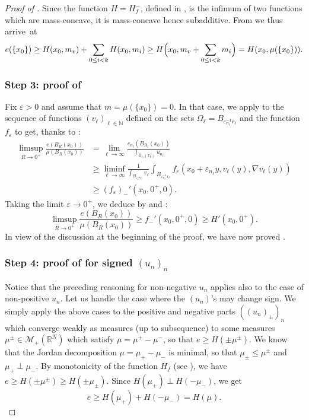 \documentclass[JEP,XML,SOM,Unicode,published]{cedram}
\theoremstyle{plain}
\theoremstyle{definition}
\newcommand{\N}{\mathbb{N}}
\newcommand{\R}{\mathbb{R}}
\newcommand{\Mspace}{\mathscr{M}}
\newcommand{\eps}{\varepsilon}
\begin{document}
\begin{proof}[Proof of ]
Since the function \(H=H_f^-\), defined in , is the infimum of two functions which are mass-concave, it is mass-concave hence subadditive. From  we thus arrive~at
\[
e(\{x_0\})\geq H(x_0,m_v) + \sum_{0\leq i<k}H(x_0,m_i) \geq H\Bigl(x_0,m_v+\sum_{0\leq i<k}m_i\Bigr)=H(x_0,\mu(\{x_0\})).
\]

\subsubsection*{Step 3: proof of } Fix $\eps >0$ and assume that \(m=\mu(\{x_0\})=0\). In that case, we apply  to the sequence of functions $(v_\ell)_{\ell\in\N}$ defined on the sets $\Omega_\ell = B_{\eps_{n_\ell}^{-1}r_\ell}$ and the function $f_\eps$ to get, thanks to :
\begin{align*}
\limsup_{R\to 0^+}\frac{e(B_R(x_0))}{\mu(B_R(x_0))} &= \lim_{\ell\to \infty} \frac{e_{n_\ell}(B_{R_\ell}(x_0))}{\int_{B_{r_\ell}(x_0)} u_{n_\ell}}\\
&\geq \liminf_{\ell\to\infty}\frac{1}{\int_{B_{\eps_{n_\ell}^{-1}r_\ell}} v_{\ell}}\int_{B_{\eps_{n_\ell}^{-1}r_\ell}} f_{\eps}(x_0+\eps_{n_\ell}y,v_\ell(y),\nabla v_\ell(y)) \\
&\geq (f_\eps)_-'(x_0,0^+,0).
\end{align*}
Taking the limit $\eps \to 0^+$, we deduce by  and :
\begin{equation}\label{vanishingDiffuse}
\limsup_{R\to 0^+}\frac{e(B_R(x_0))}{\mu(B_R(x_0))} \geq f_-'(x_0,0^+,0) \geq H'(x_0,0^+).
\end{equation}
In view of the discussion at the beginning of the proof, we have now proved .

\subsubsection*{Step 4: proof of  for signed $(u_n)_n$} Notice that the preceding reasoning for non-negative $u_n$ applies also to the case of non-positive $u_n$. Let us handle the case where the $(u_n)$'s may change sign. We simply apply the above cases to the positive and negative parts $((u_n)_\pm)_n$ which converge weakly as measures (up to subsequence) to some measures $\mu^\pm \in \Mspace_+(\R^N)$ which satisfy $\mu = \mu^+ - \mu^-$, so that $e\geq H(\pm \mu^\pm)$. We know that the Jordan decomposition $\mu = \mu_+-\mu_-$ is minimal, so that $\mu_\pm \leq \mu^\pm$ and $\mu_+ \perp \mu_-$. By monotonicity of the function $H_f$ (see ), we have $e\geq H(\pm \mu^\pm) \geq H(\pm \mu_\pm)$. Since $H(\mu_+) \perp H(- \mu_-)$, we get
\[e \geq H(\mu_+) + H(-\mu_-) = H(\mu).\]


\end{proof}
\end{document}
